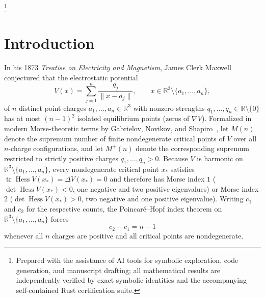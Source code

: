\documentclass[11pt,a4paper]{amsart}
\theoremstyle{definition}
\newcommand{\R}{\mathbb{R}}
\DeclareMathOperator{\Hess}{Hess}
\DeclareMathOperator{\tr}{tr}
\begin{document}
\maketitle

\footnote{Prepared with the assistance of AI tools for symbolic exploration,
code generation, and manuscript drafting; all mathematical results are
independently verified by exact symbolic identities and the accompanying
self-contained Rust certification suite.}

\section{Introduction}\label{sec:intro}

In his 1873 \emph{Treatise on Electricity and Magnetism}, James Clerk Maxwell
conjectured that the electrostatic potential
\begin{equation}\label{eq:coulomb}
  V(x) = \sum_{j=1}^n \frac{q_j}{\|x - a_j\|}, \qquad x \in \R^3 \setminus \{a_1,\dots,a_n\},
\end{equation}
of $n$ distinct point charges $a_1,\dots,a_n \in \R^3$ with nonzero strengths
$q_1,\dots,q_n \in \R \setminus \{0\}$ has at most $(n-1)^2$ isolated
equilibrium points (zeros of $\nabla V$). Formalized in modern Morse-theoretic
terms by Gabrielov, Novikov, and Shapiro~\cite{GNS2007}, let $M(n)$ denote the
supremum number of finite nondegenerate critical points of $V$ over all
$n$-charge configurations, and let $M^+(n)$ denote the corresponding supremum
restricted to strictly positive charges $q_1,\dots,q_n > 0$. Because $V$ is
harmonic on $\R^3 \setminus \{a_1,\dots,a_n\}$, every nondegenerate critical
point $x_*$ satisfies $\tr \Hess V(x_*) = \Delta V(x_*) = 0$ and therefore has
Morse index $1$ ($\det \Hess V(x_*) < 0$, one negative and two positive
eigenvalues) or Morse index $2$ ($\det \Hess V(x_*) > 0$, two negative and one
positive eigenvalue). Writing $c_1$ and $c_2$ for the respective counts, the
Poincar\'e--Hopf index theorem on $\R^3 \setminus \{a_1,\dots,a_n\}$ forces
\begin{equation}\label{eq:ph}
  c_2 - c_1 = n - 1
\end{equation}
whenever all $n$ charges are positive and all critical points are nondegenerate.
\end{document}
